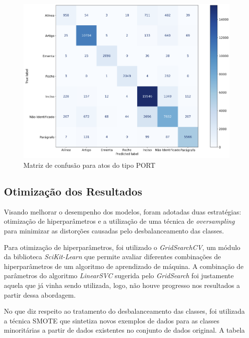 \begin{figure}[h]
	\caption{Matriz de confusão para atos do tipo PORT}
	\center
	\label{fig:matriz-confusao-port}
	\includegraphics[scale=0.53]{resultados/matriz-confusao-port.png}
	\fdp
\end{figure}

\subsection{Otimização dos Resultados}

Visando melhorar o desempenho dos modelos, foram adotadas duas estratégias: otimização de hiperparâmetros e a utilização de uma técnica de \textit{oversampling} para minimizar as distorções causadas pelo desbalanceamento das classes.

Para otimização de hiperparâmetros, foi utilizado o \textit{GridSearchCV}, um módulo da biblioteca \textit{SciKit-Learn} que permite avaliar diferentes combinações de hiperparâmetros de um  algoritmo de aprendizado de máquina. A combinação de parâmetros do algoritmo \textit{LinearSVC} sugerida pelo \textit{GridSearch} foi justamente aquela que já vinha sendo utilizada, logo, não houve progresso nos resultados a partir dessa abordagem.

No que diz respeito ao tratamento do desbalanceamento das classes, foi utilizada a técnica SMOTE\cite{Smote2002} que sintetiza novos exemplos de dados para as classes minoritárias a partir de dados existentes no conjunto de dados original. A tabela 

